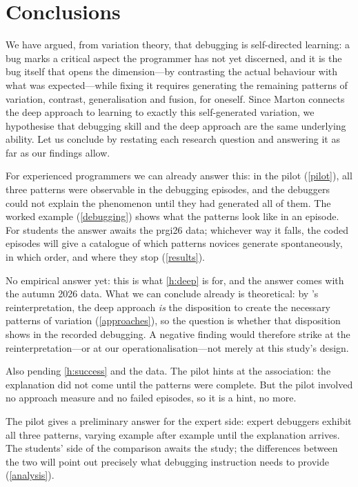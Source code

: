 \mode*
\section{Conclusions}
\label{conclusions}

We have argued, from variation theory, that debugging is self-directed
learning: a bug marks a critical aspect the programmer has not yet
discerned, and it is the bug itself that opens the dimension---by
contrasting the actual behaviour with what was expected---while fixing it
requires generating the remaining patterns of variation, contrast,
generalisation and fusion, for oneself.
Since Marton connects the deep approach to learning to exactly this
self-generated variation, we hypothesise that debugging skill and the deep
approach are the same underlying ability.
Let us conclude by restating each research question and answering it as
far as our findings allow.

\rqpatterns*
For experienced programmers we can already answer this: in the pilot
(\cref{pilot}), all three patterns were observable in the debugging
episodes, and the debuggers could not explain the phenomenon until they
had generated all of them.
The worked example (\cref{debugging}) shows what the patterns look like in
an episode.
For students the answer awaits the prgi26 data; whichever way it falls,
the coded episodes will give a catalogue of which patterns novices
generate spontaneously, in which order, and where they stop
(\cref{results}).

\rqdeep*
No empirical answer yet: this is what \cref{h:deep} is for, and the answer
comes with the autumn 2026 data.
What we can conclude already is theoretical: by \citeauthor{NCOL}'s
reinterpretation, the deep approach \emph{is} the disposition to create
the necessary patterns of variation (\cref{approaches}), so the question
is whether that disposition shows in the recorded debugging.
A negative finding would therefore strike at the reinterpretation---or at
our operationalisation---not merely at this study's design.

\rqsuccess*
Also pending \cref{h:success} and the data.
The pilot hints at the association: the explanation did not come until the
patterns were complete.
But the pilot involved no approach measure and no failed episodes, so it
is a hint, no more.

\rqexperts*
The pilot gives a preliminary answer for the expert side: expert debuggers
exhibit all three patterns, varying example after example until the
explanation arrives.
The students' side of the comparison awaits the study; the differences
between the two will point out precisely what debugging instruction needs
to provide (\cref{analysis}).

